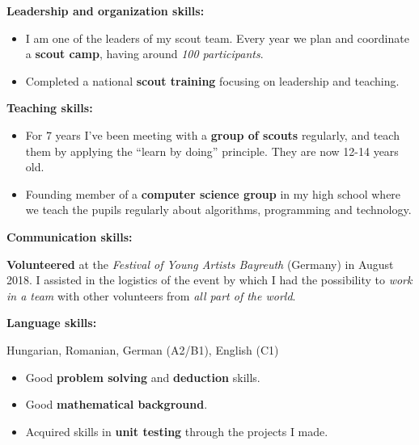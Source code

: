 
\textbf{Leadership and organization skills:} 

\begin{itemize}
\item I am one of the leaders of my scout team. Every year we plan and coordinate a \textbf{scout camp}, having around \textit{100 participants}.

\item Completed a national \textbf{scout training} focusing on leadership and teaching.
\end{itemize}

\divider

\textbf{Teaching skills:} 

\begin{itemize}
 \item For 7 years I've been meeting with a \textbf{group of scouts} regularly, and teach them by applying the ``learn by doing'' principle. They are now 12-14 years old.
 
 \item Founding member of a \textbf{computer science group} in my high school where we teach the pupils regularly about algorithms, programming and technology.
\end{itemize}

\divider

\textbf{Communication skills:} 

\textbf{Volunteered} at the \textit{Festival of Young Artists Bayreuth} (Germany) in August 2018. I assisted in the logistics of the event by which I had the possibility to \textit{work in a team} with other volunteers from \textit{all part of the world}.

\divider

\textbf{Language skills:} 

Hungarian, Romanian, German (A2/B1), English (C1)



\smallskip


\begin{itemize}

\item Good \textbf{problem solving} and \textbf{deduction} skills.

\item Good \textbf{mathematical background}.

\item Acquired skills in \textbf{unit testing} through the projects I made.

\end{itemize}


